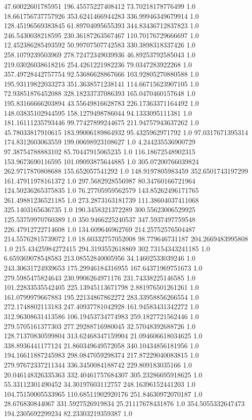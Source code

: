 47.60022601785951	196.45575227408412	73.70218178776499	1.0
18.661756737757926	353.6241466944283	336.99946349679914	1.0
128.45196569383845	61.89704095655393	344.83436712837823	1.0
246.5430038218595	230.36187263567467	110.70176729666697	1.0
12.452386285493592	50.99707507742583	330.3898318337426	1.0
258.1079239503969	278.72472349039936	46.89253792585043	1.0
219.03026038618216	254.4261221982236	79.0347283922268	1.0
357.49728442757754	92.53686628867666	103.92805270880588	1.0
195.93119822033273	351.3638571238141	114.66715623907105	1.0
72.93851876452088	328.18233737086393	165.0470460157648	1.0
195.83166666203894	43.55649816628783	226.17363371164492	1.0
148.03835102944595	158.1279498786044	94.1333095111381	1.0
181.16111235793446	99.77427899244675	211.94757943637262	1.0
45.78033817910615	183.99006189864932	95.4325962971792	1.0
97.0317671395314	174.8312603063559	199.00698923108627	1.0
4.244235536900729	97.38754788883102	85.70447915065235	1.0
116.18672548902315	153.9673690116595	101.09093875644885	1.0
305.07200766039824	262.9717870808688	155.652057541292	1.0
148.9197805983459	352.6501743197299	161.47911978161372	1.0
297.5682928556987	80.34760166721964	124.50236265375835	1.0
76.27705959562579	143.85262496171765	261.49881236521185	1.0
273.2873163181739	111.38604037411068	325.1403165636735	1.0
190.3458321372289	300.55623006529925	125.53759970760389	1.0
350.9466225240537	347.5937497759548	226.47912722714608	1.0
134.609646962769	214.25752576504487	214.55762815739072	1.0
18.60332757052008	98.779646731187	204.2669483995808	1.0
215.43425984272415	294.3193552618869	302.73154343241185	1.0
6.659369078548583	213.08552840005956	34.14602533039246	1.0
243.30631724939653	175.29946184316955	167.64371969751673	1.0
279.5985475824643	230.9906264971176	231.74338225146585	1.0
101.22833535542405	225.13945113671798	2.881976501261261	1.0
161.0799979667883	195.22134867862272	283.33958856266554	1.0
272.1748802113183	247.40937781042928	161.94583431342272	1.0
312.96308631413586	106.19453734774983	259.1827721562446	1.0
279.5705161377303	277.29288716980045	32.57048392688726	1.0
128.71370830599804	313.62468347159904	21.094606618034625	1.0
338.8936441177124	21.860349649572058	340.10434856181956	1.0
194.16611887245983	298.0847059298374	217.87229040083815	1.0
279.97672337211344	336.3450084188742	229.809183035166	1.0
20.046148326335363	332.40461757684307	305.23286695918625	1.0
55.33112301490452	34.30197603112757	248.16396152441203	1.0
104.75150005533965	110.68511902920176	251.84630972070187	1.0
28.676830844067	331.5927526919834	25.21117678431876	1.0
354.5055332647473	194.2305692299234	82.23303219359387	1.0
